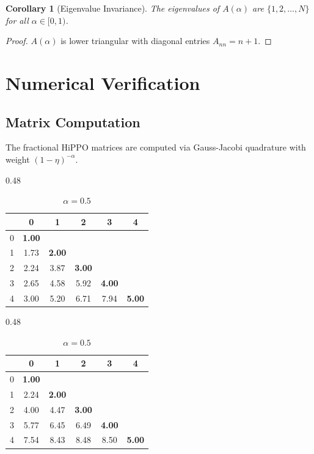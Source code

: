 \documentclass{article}
\theoremstyle{plain}
\newtheorem{corollary}[theorem]{Corollary}
\theoremstyle{definition}
\theoremstyle{remark}
\begin{document}
\begin{corollary}[Eigenvalue Invariance]
	The eigenvalues of $A(\alpha)$ are $\{1, 2, \ldots, N\}$ for all $\alpha \in [0, 1)$.
\end{corollary}

\begin{proof}
	$A(\alpha)$ is lower triangular with diagonal entries $A_{nn} = n+1$.
\end{proof}

\section{Numerical Verification}
\label{app:numerical_verification}

\subsection{Matrix Computation}

The fractional HiPPO matrices are computed via Gauss-Jacobi quadrature with weight $(1-\eta)^{-\alpha}$.

\begin{table}[h]
	\caption{Numerical verification of $A(\alpha)$ for $N=5$. Diagonal elements (bold) are invariant at $A_{nn} = n+1$.}
	\label{tab:A_numerical}
	\centering
	\small
	\begin{subtable}[t]{0.48\textwidth}
		\centering
		\caption{$\alpha = 0$ (LegS)}
		\begin{tabular}{c|ccccc}
			& 0 & 1 & 2 & 3 & 4 \\
			\hline
			0 & \textbf{1.00} & & & & \\
			1 & 1.73 & \textbf{2.00} & & & \\
			2 & 2.24 & 3.87 & \textbf{3.00} & & \\
			3 & 2.65 & 4.58 & 5.92 & \textbf{4.00} & \\
			4 & 3.00 & 5.20 & 6.71 & 7.94 & \textbf{5.00}
		\end{tabular}
	\end{subtable}
	\hfill
	\begin{subtable}[t]{0.48\textwidth}
		\centering
		\caption{$\alpha = 0.5$}
		\begin{tabular}{c|ccccc}
			& 0 & 1 & 2 & 3 & 4 \\
			\hline
			0 & \textbf{1.00} & & & & \\
			1 & 2.24 & \textbf{2.00} & & & \\
			2 & 4.00 & 4.47 & \textbf{3.00} & & \\
			3 & 5.77 & 6.45 & 6.49 & \textbf{4.00} & \\
			4 & 7.54 & 8.43 & 8.48 & 8.50 & \textbf{5.00}
		\end{tabular}
	\end{subtable}
\end{table}
\end{document}
